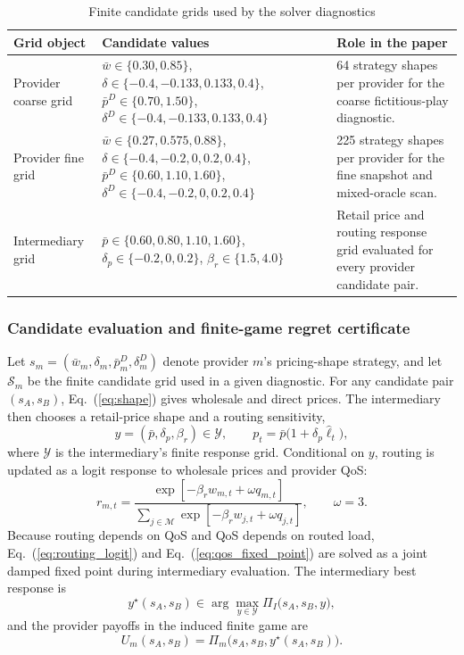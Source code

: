 \documentclass[11pt,a4paper]{article}
\newcommand{\M}{\mathcal{M}}
\begin{document}
\begin{table}[H]
\centering
\caption{Finite candidate grids used by the solver diagnostics}
\label{tab:solver_grids}
\small
\begin{tabular}{p{}p{}p{}}
\toprule
Grid object & Candidate values & Role in the paper \\
\midrule
Provider coarse grid &
$\bar w\in\{0.30,0.85\}$, $\delta\in\{-0.4,-0.133,0.133,0.4\}$, $\bar p^D\in\{0.70,1.50\}$, $\delta^D\in\{-0.4,-0.133,0.133,0.4\}$ &
64 strategy shapes per provider for the coarse fictitious-play diagnostic. \\
Provider fine grid &
$\bar w\in\{0.27,0.575,0.88\}$, $\delta\in\{-0.4,-0.2,0,0.2,0.4\}$, $\bar p^D\in\{0.60,1.10,1.60\}$, $\delta^D\in\{-0.4,-0.2,0,0.2,0.4\}$ &
225 strategy shapes per provider for the fine snapshot and mixed-oracle scan. \\
Intermediary grid &
$\bar p\in\{0.60,0.80,1.10,1.60\}$, $\delta_p\in\{-0.2,0,0.2\}$, $\beta_r\in\{1.5,4.0\}$ &
Retail price and routing response grid evaluated for every provider candidate pair. \\
\bottomrule
\end{tabular}
\end{table}

\subsubsection{Candidate evaluation and finite-game regret certificate}

Let $s_m=(\bar w_m,\delta_m,\bar p^D_m,\delta^D_m)$ denote provider $m$'s pricing-shape strategy, and let $\mathcal S_m$ be the finite candidate grid used in a given diagnostic. For any candidate pair $(s_A,s_B)$, Eq.~(\ref{eq:shape}) gives wholesale and direct prices. The intermediary then chooses a retail-price shape and a routing sensitivity,
\[
  y=(\bar p,\delta_p,\beta_r)\in\mathcal Y ,
  \qquad
  p_t=\bar p\big(1+\delta_p\widehat{\ell}_t\big),
\]
where $\mathcal Y$ is the intermediary's finite response grid. Conditional on $y$, routing is updated as a logit response to wholesale prices and provider QoS:
\begin{equation}
  r_{m,t}
  =
  \frac{\exp[-\beta_r w_{m,t}+\omega q_{m,t}]}
       {\sum_{j\in\M}\exp[-\beta_r w_{j,t}+\omega q_{j,t}]},
  \qquad \omega=3 .
  \label{eq:routing_logit}
\end{equation}
Because routing depends on QoS and QoS depends on routed load, Eq.~(\ref{eq:routing_logit}) and Eq.~(\ref{eq:qos_fixed_point}) are solved as a joint damped fixed point during intermediary evaluation. The intermediary best response is
\begin{equation}
  y^\star(s_A,s_B)\in
  \arg\max_{y\in\mathcal Y}
  \Pi_I\big(s_A,s_B,y\big),
  \label{eq:intermediary_best_response}
\end{equation}
and the provider payoffs in the induced finite game are
\begin{equation}
  U_m(s_A,s_B)=
  \Pi_m\big(s_A,s_B,y^\star(s_A,s_B)\big).
  \label{eq:finite_game_payoff}
\end{equation}
\end{document}
